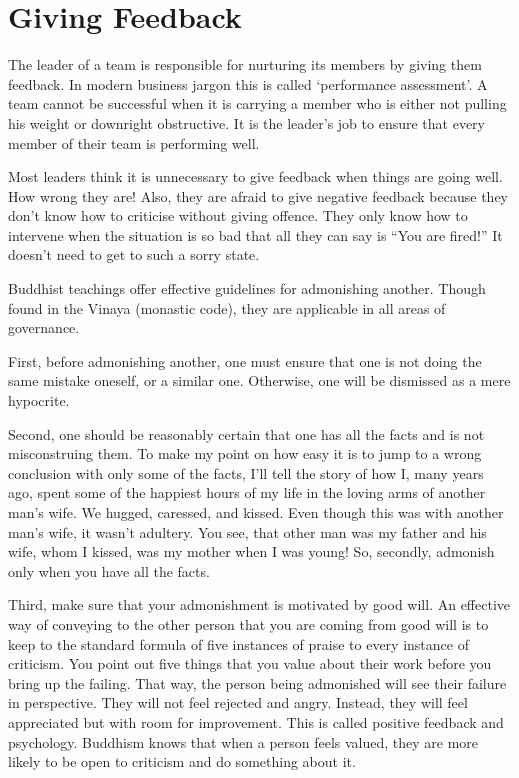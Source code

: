 \documentclass[11pt, openany]{book}
\begin{document}
\section{Giving Feedback}

The leader of a team is responsible for nurturing its
members by giving them feedback. In modern business jargon this is called ‘performance assessment’. A team cannot be successful when it is carrying a member who is either not pulling his weight or downright obstructive. It is the leader’s job to ensure that every member of their team is performing well.

Most leaders think it is unnecessary to give feedback when things are going well. How wrong they are! Also, they are afraid to give negative feedback because they don’t know how to criticise without giving offence. They only know how to intervene when the situation is so bad that all they can say is “You are fired!” It doesn’t need to get to such a sorry state.

Buddhist teachings offer effective guidelines for admonishing another. Though found in the Vinaya (monastic code), they are applicable in all areas of governance.

First, before admonishing another, one must ensure that one is not doing the same mistake oneself, or a similar one. Otherwise, one will be dismissed as a mere hypocrite.

Second, one should be reasonably certain that one has all the facts and is not misconstruing them. To make my point on how easy it is to jump to a wrong conclusion with only some of the facts, I’ll tell the story of how I, many years ago, spent some of the happiest hours of my life in the loving arms of another man’s wife. We hugged, caressed, and kissed. Even though this was with another man’s wife, it wasn’t adultery. You see, that other man was my father and his wife, whom I kissed, was my mother when I was young! So, secondly, admonish only when you have all the facts.

Third, make sure that your admonishment is motivated by good will. An effective way of conveying to the other person that you are coming from good will is to keep to the standard formula of five instances of praise to every instance of criticism. You point out five things that you value about their work before you bring up the failing. That way, the person being admonished will see their failure in perspective. They will not feel rejected and angry. Instead, they will feel appreciated but with room for improvement. This is called positive feedback and psychology. Buddhism knows that when a person feels valued, they are more likely to be open to criticism and do something about it.
\end{document}
